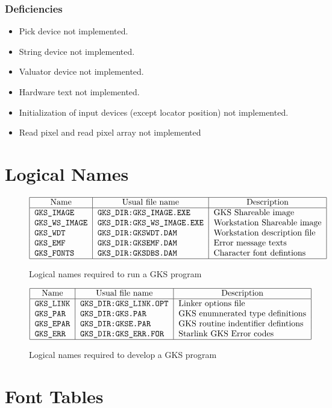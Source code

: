 \subsubsection{Deficiencies}
\begin{itemize}
\item Pick device not implemented.
\item String device not implemented.
\item Valuator device not implemented.
\item Hardware text not implemented.
\item Initialization of input devices (except locator position) not implemented.
\item Read pixel and read pixel array not implemented
\end{itemize}

\newpage\section{Logical Names}\label{logicals}
\begin{figure}[h]
\caption{Logical names required to run a GKS program}
\[\begin{tabular}{|l|l|l|}\hline
\multicolumn{1}{|c|}{Name}&\multicolumn{1}{c|}{Usual file name}&
\multicolumn{1}{c|}{Description}\\\hline
\tt GKS\_IMAGE&\tt GKS\_DIR:GKS\_IMAGE.EXE&GKS Shareable image\\
\tt GKS\_WS\_IMAGE&\tt GKS\_DIR:GKS\_WS\_IMAGE.EXE&Workstation Shareable image\\
\tt GKS\_WDT&\tt GKS\_DIR:GKSWDT.DAM&Workstation description file\\
\tt GKS\_EMF&\tt GKS\_DIR:GKSEMF.DAM&Error message texts\\
\tt GKS\_FONTS&\tt GKS\_DIR:GKSDBS.DAM&Character font defintions\\\hline
\end{tabular}\]
\end{figure} 

\begin{figure}[h]
\caption{Logical names required to develop a GKS program}
\[\begin{tabular}{|l|l|l|}\hline
\multicolumn{1}{|c|}{Name}&\multicolumn{1}{c|}{Usual file name}&
\multicolumn{1}{c|}{Description}\\\hline
\tt GKS\_LINK&\tt GKS\_DIR:GKS\_LINK.OPT&Linker options file\\
\tt GKS\_PAR&\tt GKS\_DIR:GKS.PAR &GKS enumnerated type definitions\\
\tt GKS\_EPAR&\tt GKS\_DIR:GKSE.PAR&GKS routine indentifier defintions\\
\tt GKS\_ERR&\tt GKS\_DIR:GKS\_ERR.FOR&Starlink GKS Error codes\\\hline
\end{tabular}\]
\end{figure} 
\newpage\section{Font Tables}\label{fonts}

